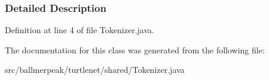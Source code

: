 \subsubsection{Detailed Description}


Definition at line 4 of file Tokenizer.\-java.



The documentation for this class was generated from the following file\-:\begin{DoxyCompactItemize}
\item 
src/ballmerpeak/turtlenet/shared/Tokenizer.\-java\end{DoxyCompactItemize}
